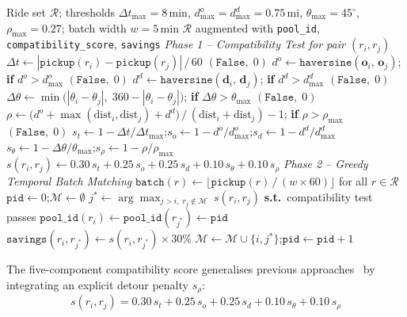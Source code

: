\documentclass[a4paper,fleqn]{cas-dc}
\begin{document}
\begin{algorithm}[H]
\caption{Multi-Criteria Ride Pooling (Compatibility Test and Greedy Matching)}
\label{alg:ride_pool}
\begin{algorithmic}[1]
\Require Ride set $\mathcal{R}$; thresholds $\Delta t_{\max}{=}8$\,min, $d^o_{\max}{=}d^d_{\max}{=}0.75$\,mi, $\theta_{\max}{=}45^\circ$, $\rho_{\max}{=}0.27$; batch width $w{=}5$\,min
\Ensure $\mathcal{R}$ augmented with \texttt{pool\_id}, \texttt{compatibility\_score}, \texttt{savings}
\Statex \textit{Phase 1 -- Compatibility Test for pair $(r_i, r_j)$}
\State $\Delta t \gets |\texttt{pickup}(r_i) - \texttt{pickup}(r_j)|\,/\,60$
 \Return $(\mathtt{False},\;0)$ \EndIf
\State $d^o \gets \texttt{haversine}(\mathbf{o}_i,\,\mathbf{o}_j)$; \textbf{if} $d^o > d^o_{\max}$ \Return $(\mathtt{False},\;0)$
\State $d^d \gets \texttt{haversine}(\mathbf{d}_i,\,\mathbf{d}_j)$; \textbf{if} $d^d > d^d_{\max}$ \Return $(\mathtt{False},\;0)$
\State $\Delta\theta \gets \min\bigl(|\theta_i-\theta_j|,\;360-|\theta_i-\theta_j|\bigr)$; \textbf{if} $\Delta\theta > \theta_{\max}$ \Return $(\mathtt{False},\;0)$
\State $\rho \gets \bigl(d^o + \max(\mathrm{dist}_i, \mathrm{dist}_j) + d^d\bigr)\,/\,(\mathrm{dist}_i + \mathrm{dist}_j) - 1$; \textbf{if} $\rho > \rho_{\max}$ \Return $(\mathtt{False},\;0)$
\State $s_t \gets 1-\Delta t/\Delta t_{\max}$;\enspace $s_o \gets 1-d^o/d^o_{\max}$;\enspace $s_d \gets 1-d^d/d^d_{\max}$
\State $s_\theta \gets 1-\Delta\theta/\theta_{\max}$;\enspace $s_\rho \gets 1-\rho/\rho_{\max}$
\State $s(r_i,r_j) \gets 0.30\,s_t + 0.25\,s_o + 0.25\,s_d + 0.10\,s_\theta + 0.10\,s_\rho$
\Statex \textit{Phase 2 -- Greedy Temporal Batch Matching}
\State $\texttt{batch}(r) \gets \lfloor\texttt{pickup}(r)\,/\,(w\!\times\!60)\rfloor$ \; for all $r\in\mathcal{R}$
\State $\texttt{pid} \gets 0$;\quad $\mathcal{M} \gets \emptyset$
    \State $j^* \gets \arg\max_{j>i,\;r_j\notin\mathcal{M}}\;s(r_i,r_j)$ \textbf{s.t.}\ compatibility test passes
      \State $\texttt{pool\_id}(r_i)\gets\texttt{pool\_id}(r_{j^*})\gets\texttt{pid}$
      \State $\texttt{savings}(r_i,r_{j^*})\gets s(r_i,r_{j^*})\times 30\%$
      \State $\mathcal{M}\gets\mathcal{M}\cup\{i,j^*\}$;\quad $\texttt{pid}\gets\texttt{pid}+1$
    \EndIf
  \EndFor
\EndFor
\end{algorithmic}
\end{algorithm}

The five-component compatibility score generalises previous approaches~\cite{furuhata2013ridesharing} by integrating an explicit detour penalty $s_\rho$:
\begin{equation}
  s(r_i, r_j) = 0.30\,s_t + 0.25\,s_o + 0.25\,s_d + 0.10\,s_\theta + 0.10\,s_\rho
  \label{eq:compat}
\end{equation}
\end{document}
